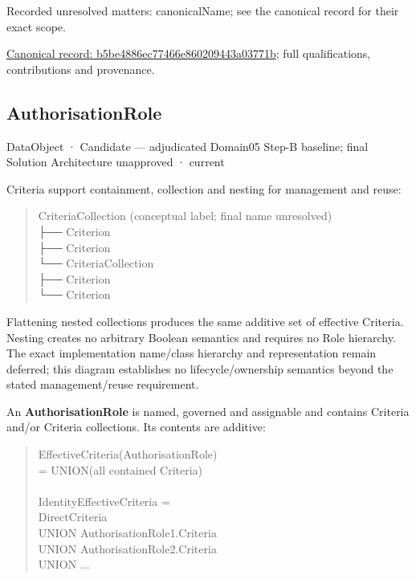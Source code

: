 {\small Recorded unresolved matters: canonicalName; see the canonical record for their exact scope.}\par
{\footnotesize \href{../../../../continuum/application/data-object/b5be4886ec77466e860209443a03771b.md}{Canonical record: b5be4886ec77466e860209443a03771b}; full qualifications, contributions and provenance.}\par
\subsection{AuthorisationRole}

\label{element:bad6431f87bd4bf59645c0962cc219a7}
{\small DataObject · Candidate — adjudicated Domain05 Step-B baseline; final Solution Architecture unapproved · current}\par

Criteria support containment, collection and nesting for management and reuse:



\begin{quote}\small\ttfamily
CriteriaCollection                 (conceptual label; final name unresolved)\\
  ├── Criterion\\
  ├── Criterion\\
  └── CriteriaCollection\\
       ├── Criterion\\
       └── Criterion\\

\end{quote}


Flattening nested collections produces the same additive set of effective
Criteria. Nesting creates no arbitrary Boolean semantics and requires no Role
hierarchy. The exact implementation name/class hierarchy and representation
remain deferred; this diagram establishes no lifecycle/ownership semantics
beyond the stated management/reuse requirement.



An \textbf{AuthorisationRole} is named, governed and assignable and contains Criteria
and/or Criteria collections. Its contents are additive:



\begin{quote}\small\ttfamily
EffectiveCriteria(AuthorisationRole)\\
    = UNION(all contained Criteria)\\
\\
IdentityEffectiveCriteria =\\
    DirectCriteria\\
    UNION AuthorisationRole1.Criteria\\
    UNION AuthorisationRole2.Criteria\\
    UNION ...\\

\end{quote}


